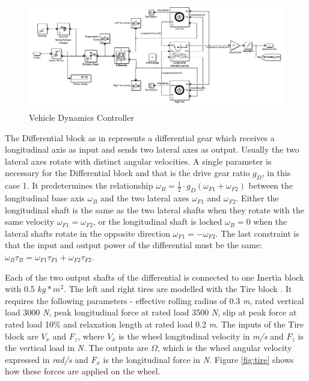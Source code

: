 \begin{figure}[h]
\centering
\includegraphics[scale=0.52]{figures/hev/vehiclecontroller}
\caption{Vehicle Dynamics Controller}
\label{fig:vehiclecontroller}
\end{figure}

The Differential block as in \citet{differentialMatlab} represents a differential gear which receives a longitudinal axis as input and sends two lateral axes as output. Usually the two lateral axes rotate with distinct angular velocities. A single parameter is necessary for the Differential block and that is the  drive gear ratio $g_D$, in this case 1. It predetermines the relationship $\omega_B = \frac{1}{2} \cdot g_D(\omega_{F1} + \omega_{F2})$ between the longitudinal base axis $\omega_B$ and the two lateral axes $\omega_{F1}$ and $\omega_{F2}$. Either the longitudinal shaft is the same as the two lateral shafts when they rotate with the same velocity $\omega_{F1} = \omega_{F2}$, or the longitudinal shaft is locked $\omega_B = 0$ when the lateral shafts rotate in the opposite direction $\omega_{F1} = -\omega_{F2}$. The last constraint is that the input and output power of the differential must be the same: $\omega_B \tau_B = \omega_{F1} \tau_{F1} + \omega_{F2} \tau_{F2}$.

Each of the two output shafts of the differential is connected to one Inertia block with 0.5 $kg*m^2$. The left and right tires are modelled with the Tire block \citep{tireMatlab}. It requires the following parameters - effective rolling radius of 0.3 \textit{m}, rated vertical load 3000 \textit{N}, peak longitudinal force at rated load 3500 \textit{N}, slip at peak force at rated load 10\% and relaxation length at rated load 0.2 \textit{m}. The inputs of the Tire block are $V_x$ and $F_z$, where $V_x$ is the wheel longitudinal velocity in \textit{m/s} and $F_z$ is the vertical load in \textit{N}. The outputs are $\Omega$, which is the wheel angular velocity expressed in \textit{rad/s} and $F_x$ is the longitudinal force in \textit{N}. Figure \ref{fig:tire} shows how these forces are applied on the wheel.

